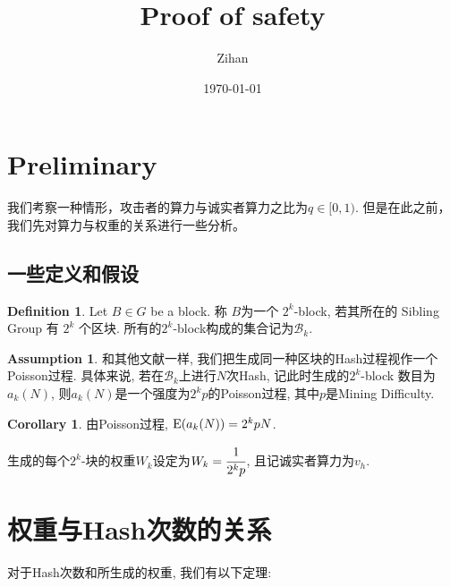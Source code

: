 \documentclass[UTF8]{ctexart}
\title{Proof of safety}
\author{Zihan}
\date{\today}
\theoremstyle{definition}
\newtheorem{definition}{Definition}
\newtheorem*{assumption}{Assumption}
\newtheorem*{corollary}{Corollary}
\theoremstyle{plain}
\begin{document}
\maketitle

\section{Preliminary}
我们考察一种情形，攻击者的算力与诚实者算力之比为$q \in [0,1)$. 但是在此之前，我们先对算力与权重的关系进行一些分析。

\subsection{一些定义和假设}
\begin{definition}
    Let $B\in G$ be a block. 称 $B$为一个 $2^k$-block, 若其所在的 Sibling Group 有 $2^k$ 个区块. 
所有的$2^k$-block构成的集合记为$\mathcal{B}_k$.
\end{definition}




\begin{assumption}
    和其他文献一样, 我们把生成同一种区块的Hash过程视作一个Poisson过程. 具体来说, 若在$\mathcal{B}_k$上进行$N$次Hash, 记此时生成的$2^k$-block
    数目为$a_k(N)$, 则$a_k(N)$是一个强度为$2^kp$的Poisson过程, 其中$p$是Mining Difficulty.
\end{assumption}
\begin{corollary}
    由Poisson过程, ${\rm E}(a_k(N)) = 2^k p N$.
\end{corollary}
生成的每个$2^k$-块的权重$W_k$设定为$W_k = \cfrac{1}{2^k p}$, 且记诚实者算力为$v_h$.


\section{权重与Hash次数的关系}
对于Hash次数和所生成的权重, 我们有以下定理:
\end{document}
